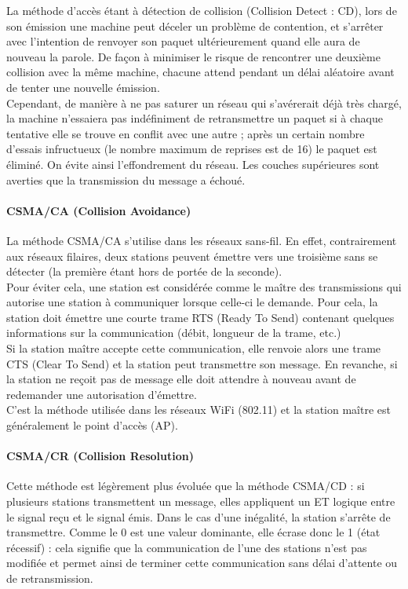 \documentclass[11pt, a4paper, twoside]{book}
\begin{document}
{La méthode d'accès étant à détection de collision (Collision Detect : CD), lors de son émission une machine peut déceler un problème de contention, et s'arrêter avec l'intention de renvoyer son paquet ultérieurement quand elle aura de nouveau la parole. De façon à minimiser le risque de rencontrer une deuxième collision avec la même machine, chacune attend pendant un délai aléatoire avant de tenter une nouvelle émission.\\

Cependant, de manière à ne pas saturer un réseau qui s'avérerait déjà très chargé, la machine n'essaiera pas indéfiniment de retransmettre un paquet si à chaque tentative elle se trouve en conflit avec une autre ; après un certain nombre d'essais infructueux (le nombre maximum de reprises est de 16) le paquet est éliminé. On évite ainsi l'effondrement du réseau. Les couches supérieures sont averties que la transmission du message a échoué.

\paragraph{CSMA/CA (Collision Avoidance)}
La méthode CSMA/CA s'utilise dans les réseaux sans-fil. En effet, contrairement aux réseaux filaires, deux stations peuvent émettre vers une troisième sans se détecter (la première étant hors de portée de la seconde).\\

Pour éviter cela, une station est considérée comme le maître des transmissions qui autorise une station à communiquer lorsque celle-ci le demande. Pour cela, la station doit émettre une courte trame RTS (Ready To Send) contenant quelques informations sur la communication (débit, longueur de la trame, etc.)\\

Si la station maître accepte cette communication, elle renvoie alors une trame CTS (Clear To Send) et la station peut transmettre son message. En revanche, si la station ne reçoit pas de message elle doit attendre à nouveau avant de redemander une autorisation d'émettre.\\

C'est la méthode utilisée dans les réseaux WiFi (802.11) et la station maître est généralement le point d'accès (AP).

\paragraph{CSMA/CR (Collision Resolution)}
Cette méthode est légèrement plus évoluée que la méthode CSMA/CD : si plusieurs stations transmettent un message, elles appliquent un ET logique entre le signal reçu et le signal émis. Dans le cas d'une inégalité, la station s'arrête de transmettre. Comme le 0 est une valeur dominante, elle écrase donc le 1 (état récessif) : cela signifie que la communication de l'une des stations n'est pas modifiée et permet ainsi de terminer cette communication sans délai d'attente ou de retransmission.\\

}
\end{document}
